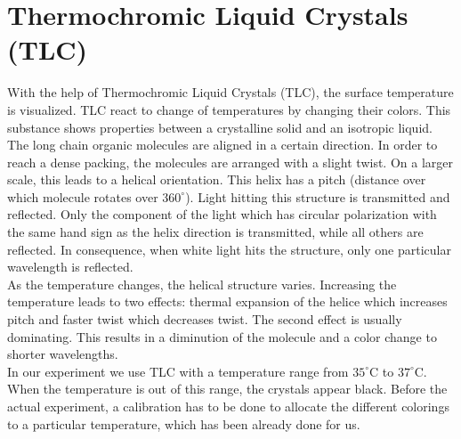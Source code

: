 \section{Thermochromic Liquid Crystals (TLC)}

With the help of Thermochromic Liquid Crystals (TLC), the surface temperature is visualized. TLC react to change of temperatures by changing their colors. This substance shows properties between a crystalline solid and an isotropic liquid. \\

The long chain organic molecules are aligned in a certain direction. In order to reach a dense packing, the molecules are arranged with a slight twist. On a larger scale, this leads to a helical orientation. This helix has a pitch (distance over which  molecule rotates over $360^\circ$). Light hitting this structure is transmitted and reflected. Only the component of the light which has circular polarization with the same hand sign as the helix direction is transmitted, while all others are reflected. In consequence, when white light hits the structure, only one particular wavelength is reflected.\\

As the temperature changes, the helical structure varies. Increasing the temperature leads to two effects: thermal expansion of the helice which increases pitch and faster twist which decreases twist. The second effect is usually dominating. This results in a diminution of the molecule and a color change to shorter wavelengths.\\

In our experiment we use TLC with a temperature range from $35^\circ$C to $37^\circ$C. When the temperature is out of this range, the crystals appear black. Before the actual experiment, a calibration has to be done to allocate the different colorings to a particular temperature, which has been already done for us.



